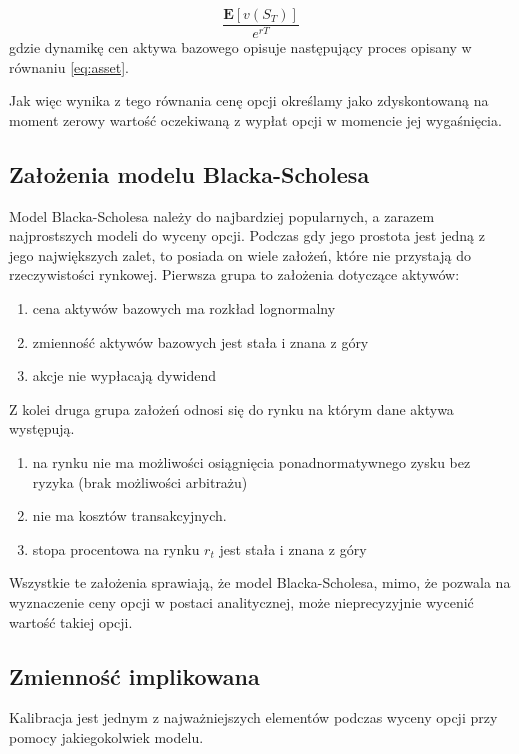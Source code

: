 \documentclass{pracamgr}
\begin{document}
\begin{equation}
\label{eq:discounting}
 \frac{\mathbf{E}[v(S_T)]}{e^{rT}}
\end{equation}
gdzie dynamikę cen aktywa bazowego opisuje następujący proces opisany w równaniu \ref{eq:asset}.

Jak więc wynika z tego równania cenę opcji określamy jako zdyskontowaną na moment zerowy wartość
oczekiwaną z wypłat opcji w momencie jej wygaśnięcia. 

\subsection{Założenia modelu Blacka-Scholesa} %
\label{sub:zalozenia_modelu_blacka_scholesa}

Model Blacka-Scholesa należy do najbardziej popularnych, a zarazem najprostszych modeli do wyceny 
opcji. Podczas gdy jego prostota jest jedną z jego największych zalet, to posiada on wiele założeń,
które nie przystają do rzeczywistości rynkowej. Pierwsza grupa to założenia dotyczące aktywów:
\begin{enumerate}
\item cena aktywów bazowych ma rozkład lognormalny
\item zmienność aktywów bazowych jest stała i znana z góry
\item akcje nie wypłacają dywidend
\end{enumerate}
Z kolei druga grupa założeń odnosi się do rynku na którym dane aktywa występują.
\begin{enumerate}
\item na rynku nie ma możliwości osiągnięcia ponadnormatywnego zysku bez ryzyka (brak możliwości arbitrażu)
\item nie ma kosztów transakcyjnych.
\item stopa procentowa na rynku $r_t$ jest stała i znana z góry 
\end{enumerate}

Wszystkie te założenia sprawiają, że model Blacka-Scholesa, mimo, że pozwala na wyznaczenie ceny
 opcji w postaci analitycznej, może nieprecyzyjnie wycenić wartość takiej opcji.
  
\subsection{Zmienność implikowana} %
\label{sub:zmienno_implikowana} 
Kalibracja jest jednym z najważniejszych elementów podczas wyceny opcji przy pomocy 
jakiegokolwiek modelu.  
\end{document}
